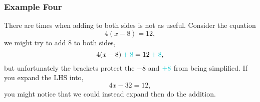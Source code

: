 \documentclass[a4paper,12pt]{article}
\begin{document}
\subsubsection*{Example Four}

There are times when adding to both sides is not as useful. 
Consider the equation
$$4(x - 8) = 12,$$
we might try to add {\color{Turquoise3}8} to both sides,
$$4(x - 8) \color{Turquoise3}+ 8\color{black} = 12 \color{Turquoise3}+ 8\color{black},$$
but unfortunately the brackets protect the $-8$ and 
$\color{Turquoise3}+8$ from being simplified. If you expand the
LHS into,
$$4x - 32 = 12,$$
you might notice that we could instead expand then do the addition.
\end{document}
